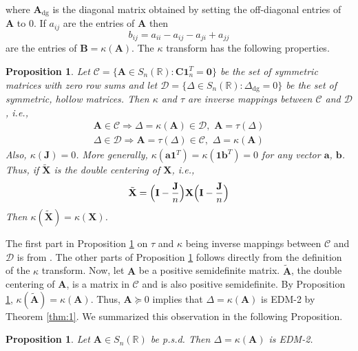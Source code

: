 \documentclass[10pt,twocolumn]{article}
\newtheorem{proposition}[theorem]{Proposition}
\numberwithin{equation}{section}
\begin{document}
where $\mathbf{A}_{\mathrm{dg}}$ is the diagonal matrix obtained by
setting the off-diagonal entries of $\mathbf{A}$ to $0$. If $a_{ij}$
are the entries of $\mathbf{A}$ then
\begin{equation}
  \label{eq:3}
  b_{ij} = a_{ii} - a_{ij} - a_{ji} + a_{jj}
\end{equation}
are the entries of $\mathbf{B} = \kappa(\mathbf{A})$. The $\kappa$
transform has the following properties.
\begin{proposition}
  \label{prop:1}
  Let $\mathcal{C} = \{ \mathbf{A} \in S_n(\mathbb{R}) \colon
  \mathbf{C}\bm{1}_{n}^{T} = \bm{0} \}$ be the set of symmetric
  matrices with zero row sums and let $\mathcal{D} = \{ \Delta \in
  S_n(\mathbb{R}) \colon \Delta_{\mathrm{dg}} = 0 \}$ be the set of
  symmetric, hollow matrices. Then $\kappa$ and $\tau$ are inverse
  mappings between $\mathcal{C}$ and $\mathcal{D}$, i.e.,
  \begin{gather}
    \label{eq:55}
    \mathbf{A} \in \mathcal{C}
    \Longrightarrow \Delta = \kappa(\mathbf{A}) \in \mathcal{D}, \,\,
    \mathbf{A} = \tau(\Delta) \\
    \Delta \in \mathcal{D} \Longrightarrow \mathbf{A} = \tau(\Delta)
    \in \mathcal{C}, \,\, \Delta = \kappa(\mathbf{A})
  \end{gather}
  Also, $\kappa(\mathbf{J}) = 0$. More generally,
  $\kappa(\bm{a}\bm{1}^{T}) = \kappa(\bm{1}\bm{b}^{T}) = 0$ for any
  vector $\bm{a}$, $\bm{b}$. Thus, if $\tilde{\mathbf{X}}$ is the
  double centering of $\mathbf{X}$, i.e.,
  \begin{equation}
    \label{eq:4}
    \tilde{\mathbf{X}} = \Bigl(\mathbf{I} - \frac{\mathbf{J}}{n}\Bigr)\mathbf{X} \Bigl(\mathbf{I} - \frac{\mathbf{J}}{n}\Bigr)
  \end{equation}
  Then $\kappa(\tilde{\mathbf{X}}) = \kappa(\mathbf{X})$.
\end{proposition}
The first part in Proposition \ref{prop:1} on $\tau$ and $\kappa$
being inverse mappings between $\mathcal{C}$ and $\mathcal{D}$ is from 
\cite{critchley88:_certain_linear_mappin}. The other parts of
Proposition \ref{prop:1} follows directly from the definition of the
$\kappa$ transform. Now, let $\mathbf{A}$ be a positive semidefinite
matrix. $\tilde{\mathbf{A}}$, the double centering of $\mathbf{A}$, is a matrix
in $\mathcal{C}$ and is also positive semidefinite. By Proposition
\ref{prop:1}, $\kappa(\tilde{\mathbf{A}}) = \kappa(\mathbf{A})$. Thus,
$\mathbf{A} \succeq 0$ implies that $\Delta = \kappa(\mathbf{A})$ is
EDM-2 by Theorem \ref{thm:1}. We summarized this observation in the
following Proposition.
\begin{proposition}
  \label{prop:2}
  Let $\mathbf{A} \in S_n(\mathbb{R})$ be p.s.d. Then $\Delta =
  \kappa(\mathbf{A})$ is EDM-2.
\end{proposition}
\end{document}
